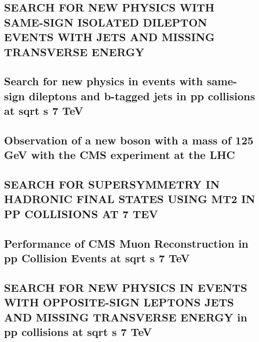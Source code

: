 \documentclass[a4paper, 11pt, twoside, openright]{report}
\begin{document}
\subsection{SEARCH FOR NEW PHYSICS WITH SAME-SIGN ISOLATED DILEPTON EVENTS WITH JETS AND MISSING TRANSVERSE ENERGY}


\subsection{Search for new physics in events with same-sign dileptons and b-tagged jets in pp collisions at sqrt s 7 TeV}


\subsection{Observation of a new boson with a mass of 125 GeV with the CMS experiment at the LHC }


\subsection{SEARCH FOR SUPERSYMMETRY IN HADRONIC FINAL STATES USING MT2 IN PP COLLISIONS AT 7 TEV}


\subsection{Performance of CMS Muon Reconstruction in pp Collision Events at sqrt s 7 TeV}


\subsection{SEARCH FOR NEW PHYSICS IN EVENTS WITH OPPOSITE-SIGN LEPTONS JETS AND MISSING TRANSVERSE ENERGY in pp collisions at sqrt s 7 TeV}

\end{document}
